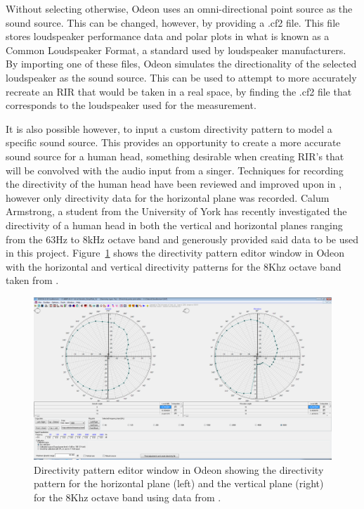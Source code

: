 \documentclass[../../main.tex]{subfiles}
\begin{document}
				Without selecting otherwise, Odeon uses an omni-directional point source as the sound source. This can be changed, however, by providing a .cf2 file. This file stores loudspeaker performance data and polar plots in what is known as a Common Loudspeaker Format, a standard used by loudspeaker manufacturers. By importing one of these files, Odeon simulates the directionality of the selected loudspeaker as the sound source. This can be used to attempt to more accurately recreate an \ac{RIR} that would be taken in a real space, by finding the .cf2 file that corresponds to the loudspeaker used for the measurement.

				It is also possible however, to input a custom directivity pattern to model a specific sound source. This provides an opportunity to create a more accurate sound source for a human head, something desirable when creating \ac{RIR}'s that will be convolved with the audio input from a singer. Techniques for recording the directivity of the human head have been reviewed and improved upon in \cite{Monson2012b}, however only directivity data for the horizontal plane was recorded. Calum Armstrong, a student from the University of York has recently investigated the directivity of a human head in both the vertical and horizontal planes ranging from the 63Hz to 8kHz octave band \cite{calum} and generously provided said data to be used in this project. Figure~\ref{directivity} shows the directivity pattern editor window in Odeon with the horizontal and vertical directivity patterns for the 8Khz octave band taken from \cite{calum}. 


				\begin{figure}[H]
					\centerline{\includegraphics[scale = 0.3]{Sections/Implementation/Odeon/images/Directivity/DirectivityPattern.png}}
					\caption{Directivity pattern editor window in Odeon showing the directivity pattern for the horizontal plane (left) and the vertical plane (right) for the 8Khz octave band using data from \cite{calum}.}
					\label{directivity}
				\end{figure}
\end{document}
